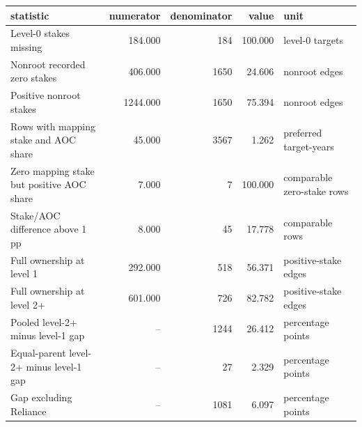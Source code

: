 \begin{tabular}{lrrrl}
\toprule
statistic & numerator & denominator & value & unit \\
\midrule
Level-0 stakes missing & 184.000 & 184 & 100.000 & level-0 targets \\
Nonroot recorded zero stakes & 406.000 & 1650 & 24.606 & nonroot edges \\
Positive nonroot stakes & 1244.000 & 1650 & 75.394 & nonroot edges \\
Rows with mapping stake and AOC share & 45.000 & 3567 & 1.262 & preferred target-years \\
Zero mapping stake but positive AOC share & 7.000 & 7 & 100.000 & comparable zero-stake rows \\
Stake/AOC difference above 1 pp & 8.000 & 45 & 17.778 & comparable rows \\
Full ownership at level 1 & 292.000 & 518 & 56.371 & positive-stake edges \\
Full ownership at level 2+ & 601.000 & 726 & 82.782 & positive-stake edges \\
Pooled level-2+ minus level-1 gap & -- & 1244 & 26.412 & percentage points \\
Equal-parent level-2+ minus level-1 gap & -- & 27 & 2.329 & percentage points \\
Gap excluding Reliance & -- & 1081 & 6.097 & percentage points \\
\bottomrule
\end{tabular}
